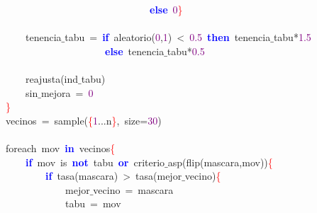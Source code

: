 \mbox{}\ \ \ \ \ \ \ \ \ \ \ \ \ \ \ \ \ \ \ \ \ \ \ \ \ \ \ \ \ \ \ \ \ \ \ \ \ \textbf{\textcolor{Blue}{else}}\ \textcolor{Purple}{0}\textcolor{Red}{\}} \\
\mbox{} \\
\mbox{}\ \ \ \ \ \ \ \ \ \ \ \ tenencia$\_$tabu\ \textcolor{BrickRed}{=}\ \textbf{\textcolor{Blue}{if}}\ aleatorio\textcolor{BrickRed}{(}\textcolor{Purple}{0}\textcolor{BrickRed}{,}\textcolor{Purple}{1}\textcolor{BrickRed}{)}\ \textcolor{BrickRed}{\textless{}}\ \textcolor{Purple}{0.5}\ \textbf{\textcolor{Blue}{then}}\ tenencia$\_$tabu\textcolor{BrickRed}{*}\textcolor{Purple}{1.5} \\
\mbox{}\ \ \ \ \ \ \ \ \ \ \ \ \ \ \ \ \ \ \ \ \ \ \ \ \ \ \ \ \textbf{\textcolor{Blue}{else}}\ tenencia$\_$tabu\textcolor{BrickRed}{*}\textcolor{Purple}{0.5} \\
\mbox{} \\
\mbox{}\ \ \ \ \ \ \ \ \ \ \ \ reajusta\textcolor{BrickRed}{(}ind$\_$tabu\textcolor{BrickRed}{)} \\
\mbox{}\ \ \ \ \ \ \ \ \ \ \ \ sin$\_$mejora\ \textcolor{BrickRed}{=}\ \textcolor{Purple}{0} \\
\mbox{}\ \ \ \ \ \ \ \ \textcolor{Red}{\}} \\
\mbox{}\ \ \ \ \ \ \ \ vecinos\ \textcolor{BrickRed}{=}\ sample\textcolor{BrickRed}{(}\textcolor{Red}{\{}\textcolor{Purple}{1}\textcolor{BrickRed}{...}n\textcolor{Red}{\}}\textcolor{BrickRed}{,}\ size\textcolor{BrickRed}{=}\textcolor{Purple}{30}\textcolor{BrickRed}{)} \\
\mbox{} \\
\mbox{}\ \ \ \ \ \ \ \ foreach\ mov\ \textbf{\textcolor{Blue}{in}}\ vecinos\textcolor{Red}{\{} \\
\mbox{}\ \ \ \ \ \ \ \ \ \ \ \ \textbf{\textcolor{Blue}{if}}\ mov\ is\ \textbf{\textcolor{Blue}{not}}\ tabu\ \textbf{\textcolor{Blue}{or}}\ criterio$\_$asp\textcolor{BrickRed}{(}flip\textcolor{BrickRed}{(}mascara\textcolor{BrickRed}{,}mov\textcolor{BrickRed}{))}\textcolor{Red}{\{} \\
\mbox{}\ \ \ \ \ \ \ \ \ \ \ \ \ \ \ \ \textbf{\textcolor{Blue}{if}}\ tasa\textcolor{BrickRed}{(}mascara\textcolor{BrickRed}{)}\ \textcolor{BrickRed}{\textgreater{}}\ tasa\textcolor{BrickRed}{(}mejor$\_$vecino\textcolor{BrickRed}{)}\textcolor{Red}{\{} \\
\mbox{}\ \ \ \ \ \ \ \ \ \ \ \ \ \ \ \ \ \ \ \ mejor$\_$vecino\ \textcolor{BrickRed}{=}\ mascara \\
\mbox{}\ \ \ \ \ \ \ \ \ \ \ \ \ \ \ \ \ \ \ \ tabu\ \textcolor{BrickRed}{=}\ mov \\
